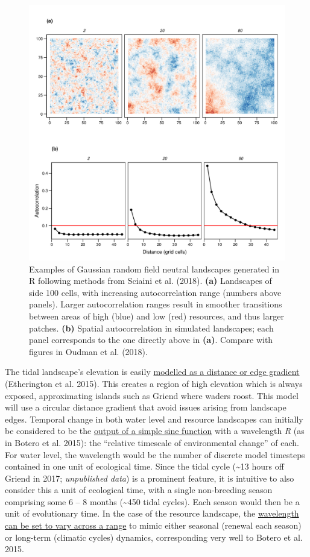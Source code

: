 \documentclass[]{scrartcl}
\begin{document}
\begin{linenumbers}
\begin{figure}
	\centering
	\includegraphics[width=0.7\linewidth]{intro_essay_figure3}
	\caption{Examples of Gaussian random field neutral landscapes generated in R following methods from Sciaini et al. (2018). \textbf{(a)} Landscapes of side 100 cells, with increasing autocorrelation range (numbers above panels). Larger autocorrelation ranges result in smoother transitions between areas of high (blue) and low (red) resources, and thus larger patches. \textbf{(b)} Spatial autocorrelation in simulated landscapes; each panel corresponds to the one directly above in \textbf{(a)}. Compare with figures in Oudman et al. (2018).}
	\label{fig:introessayfigure3}
\end{figure}


The tidal landscape's elevation is easily \underline{modelled as a distance
or edge gradient}
(\protect\hypertarget{__UnoMark__4137_580056431}{}{\protect\hypertarget{__UnoMark__44758_2549695377}{}{}}Etherington
et al. 2015). This creates a region of high elevation which is always
exposed, approximating islands such as Griend where waders roost. This
model will use a circular distance gradient that avoid issues arising
from landscape edges. Temporal change in both water level and resource
landscapes can initially be considered to be the \underline{output of a
simple sine function} with a wavelength \emph{R} (as in
\protect\hypertarget{__UnoMark__4144_580056431}{}{}Botero et al. 2015):
the ``relative timescale of environmental change'' of each. For water
level, the wavelength would be the number of discrete model timesteps
contained in one unit of ecological time. Since the tidal cycle
(\textasciitilde{}13 hours off Griend in 2017; \emph{unpublished data})
is a prominent feature, it is intuitive to also consider this a unit of
ecological time, with a single non-breeding season comprising some 6 --
8 months (\textasciitilde{}450 tidal cycles). Each season would then be
a unit of evolutionary time. In the case of the resource landscape, the
\underline{wavelength can be set to vary across a range} to mimic either
seasonal (renewal each season) or long-term (climatic cycles) dynamics,
corresponding very well to
\protect\hypertarget{__UnoMark__4151_580056431}{}{}Botero et al. 2015.




\end{linenumbers}
\end{document}
